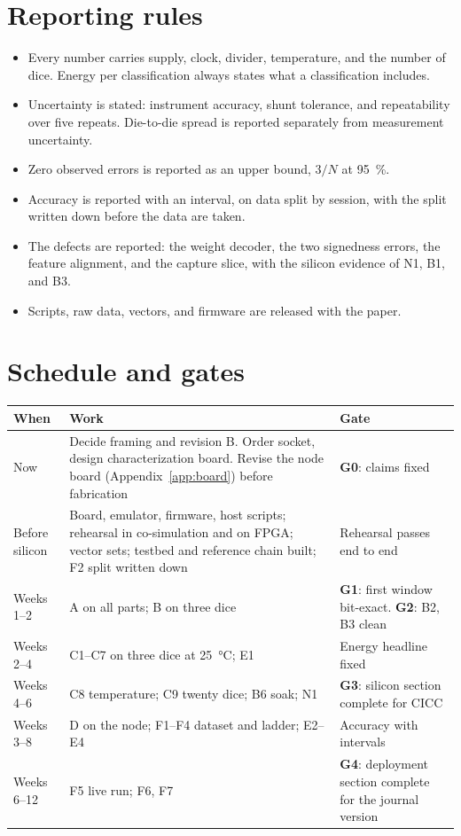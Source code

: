 \documentclass[10pt]{article}
\begin{document}
\section{Reporting rules}
\begin{itemize}
\item Every number carries supply, clock, divider, temperature, and the
number of dice. Energy per classification always states what a
classification includes.
\item Uncertainty is stated: instrument accuracy, shunt tolerance, and
repeatability over five repeats. Die-to-die spread is reported
separately from measurement uncertainty.
\item Zero observed errors is reported as an upper bound, $3/N$ at
\SI{95}{\percent}.
\item Accuracy is reported with an interval, on data split by session,
with the split written down before the data are taken.
\item The defects are reported: the weight decoder, the two signedness
errors, the feature alignment, and the capture slice, with the silicon
evidence of N1, B1, and B3.
\item Scripts, raw data, vectors, and firmware are released with the paper.
\end{itemize}

\section{Schedule and gates}
{\small
\begin{longtable}{@{}L{2.6cm}L{8.4cm}L{4.0cm}@{}}
\toprule
When & Work & Gate\\
\midrule
\endhead
Now & Decide framing and revision B. Order socket, design characterization board. Revise the node board (Appendix~\ref{app:board}) before fabrication & \textbf{G0}: claims fixed\\
Before silicon & Board, emulator, firmware, host scripts; rehearsal in co-simulation and on FPGA; vector sets; testbed and reference chain built; F2 split written down & Rehearsal passes end to end\\
Weeks 1--2 & A on all parts; B on three dice & \textbf{G1}: first window bit-exact. \textbf{G2}: B2, B3 clean\\
Weeks 2--4 & C1--C7 on three dice at \SI{25}{\celsius}; E1 & Energy headline fixed\\
Weeks 4--6 & C8 temperature; C9 twenty dice; B6 soak; N1 & \textbf{G3}: silicon section complete for CICC\\
Weeks 3--8 & D on the node; F1--F4 dataset and ladder; E2--E4 & Accuracy with intervals\\
Weeks 6--12 & F5 live run; F6, F7 & \textbf{G4}: deployment section complete for the journal version\\
\bottomrule
\end{longtable}}
\end{document}
